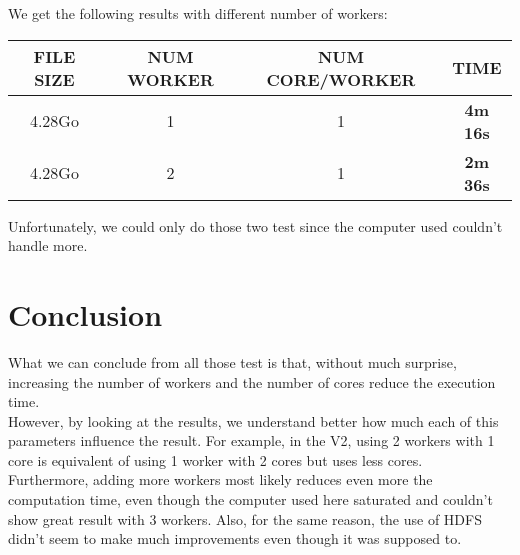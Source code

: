 \documentclass{article}
\begin{document}
\noindent We get the following results with different number of workers: \\
\begin{center}
    \begin{tabular}{||c c c c||} 
    \hline
    FILE SIZE & NUM WORKER & NUM CORE/WORKER & TIME \\ [0.5ex] 
    \hline\hline
    4.28Go & 1 & 1 & \textbf{4m 16s} \\ 
    \hline
    4.28Go & 2 & 1 & \textbf{2m 36s} \\ 
    \hline
    \end{tabular}
\end{center}
\vspace*{0.2cm}

Unfortunately, we could only do those two test since the computer used couldn't handle more.

\section{Conclusion}

What we can conclude from all those test is that, without much surprise, increasing the number of workers and the number of cores reduce the execution time. \\

However, by looking at the results, we understand better how much each of this parameters influence the result. For example, in the V2, using 2 workers with 1 core is equivalent of using 1 worker with 2 cores but uses less cores. \\

Furthermore, adding more workers most likely reduces even more the computation time, even though the computer used here saturated and couldn't show great result with 3 workers. Also, for the same reason, the use of HDFS didn't seem to make much improvements even though it was supposed to.
\end{document}
